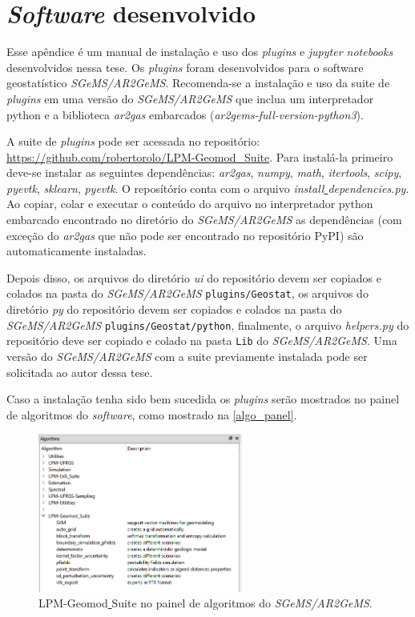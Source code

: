 \chapter{\textit{Software} desenvolvido} \label{software}

Esse apêndice é um manual de instalação e uso dos \textit{plugins} e \textit{jupyter notebooks} desenvolvidos nessa tese. Os \textit{plugins} foram desenvolvidos para o software geostatístico \textit{SGeMS/AR2GeMS}. Recomenda-se a instalação e uso da suite de \textit{plugins} em uma versão do \textit{SGeMS/AR2GeMS} que inclua um interpretador python e a biblioteca \textit{ar2gas} embarcados (\textit{ar2gems-full-version-python3}).

A suite de \textit{plugins} pode ser acessada no repositório: \url{https://github.com/robertorolo/LPM-Geomod_Suite}. Para instalá-la primeiro deve-se instalar as seguintes dependências: \textit{ar2gas}, \textit{numpy}, \textit{math}, \textit{itertools}, \textit{scipy}, \textit{pyevtk}, \textit{sklearn}, \textit{pyevtk}. O reposítório conta com o arquivo \textit{install\underline{ }dependencies.py}. Ao copiar, colar e executar o conteúdo do arquivo no interpretador python embarcado encontrado no diretório do \textit{SGeMS/AR2GeMS} as dependências (com exceção do \textit{ar2gas} que não pode ser encontrado no repositório PyPI) são automaticamente instaladas.

Depois disso, os arquivos do diretório \textit{ui} do repositório devem ser copiados e colados na pasta do \textit{SGeMS/AR2GeMS} \texttt{plugins/Geostat}, os arquivos do diretório \textit{py} do repositório devem ser copiados e colados na pasta do \textit{SGeMS/AR2GeMS} \texttt{plugins/Geostat/python}, finalmente, o arquivo \textit{helpers.py} do repositório deve ser copiado e colado na pasta \texttt{Lib} do \textit{SGeMS/AR2GeMS}. Uma versão do \textit{SGeMS/AR2GeMS} com a suite previamente instalada pode ser solicitada ao autor dessa tese.

Caso a instalação tenha sido bem sucedida os \textit{plugins} serão mostrados no painel de algoritmos do \textit{software}, como mostrado na \autoref{algo_panel}.

\begin{figure}[H]
	\caption{\label{algo_panel} LPM-Geomod\underline{ }Suite no painel de algoritmos do \textit{SGeMS/AR2GeMS}.}
	\centering
		\includegraphics[width=0.6\textwidth]{apendice/imagens/algorithms.PNG}
\end{figure}

